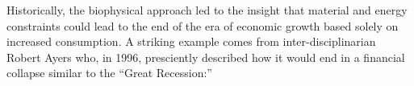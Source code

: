 Historically, the biophysical approach led to the insight 
that material and energy constraints could lead to the 
end of the era of economic growth based solely on increased
consumption.
A striking example comes from 
inter-disciplinarian Robert Ayers who, in 1996, presciently described 
how it would end in a financial collapse similar to the ``Great Recession:''


%


